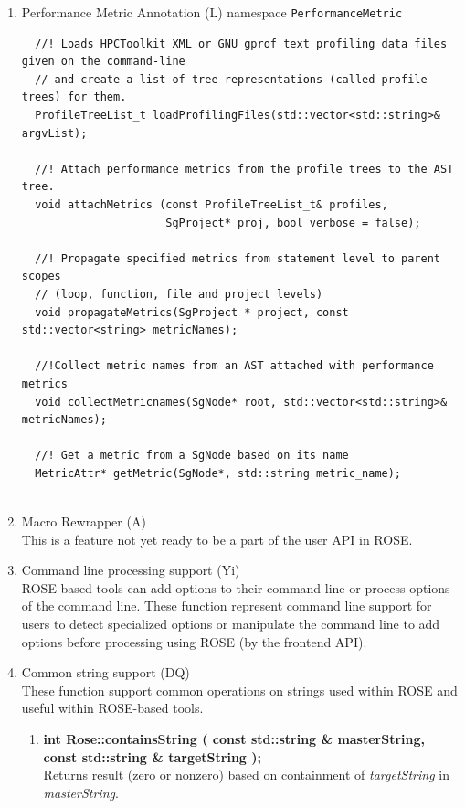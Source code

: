 \begin{enumerate}
\begin{lstlisting}
\end{lstlisting}

   \item Performance Metric Annotation (L)
   namespace \lstinline{PerformanceMetric} 
\begin{lstlisting}
  //! Loads HPCToolkit XML or GNU gprof text profiling data files given on the command-line
  // and create a list of tree representations (called profile trees) for them.
  ProfileTreeList_t loadProfilingFiles(std::vector<std::string>& argvList);

  //! Attach performance metrics from the profile trees to the AST tree.
  void attachMetrics (const ProfileTreeList_t& profiles,
                      SgProject* proj, bool verbose = false);

  //! Propagate specified metrics from statement level to parent scopes 
  // (loop, function, file and project levels)
  void propagateMetrics(SgProject * project, const std::vector<string> metricNames);

  //!Collect metric names from an AST attached with performance metrics
  void collectMetricnames(SgNode* root, std::vector<std::string>& metricNames); 

  //! Get a metric from a SgNode based on its name
  MetricAttr* getMetric(SgNode*, std::string metric_name);


\end{lstlisting}

   \item Macro Rewrapper (A) \\
         This is a feature not yet ready to be a part of the user API in ROSE.

   \item Command line processing support (Yi) \\
   ROSE based tools can add options to their command line or process options of the
   command line.  These function represent command line support for users to detect
   specialized options or manipulate the command line to add options before processing
   using ROSE (by the frontend API).

   \item Common string support (DQ) \\
         These function support common operations on strings used within ROSE and 
         useful within ROSE-based tools.
   \begin{enumerate}
      \item {\bf int Rose::containsString ( const std::string \& masterString, const std::string \& targetString );} \\
      Returns result (zero or nonzero) based on containment of {\em targetString} in {\em masterString}.
   \end{enumerate}


\end{enumerate}
